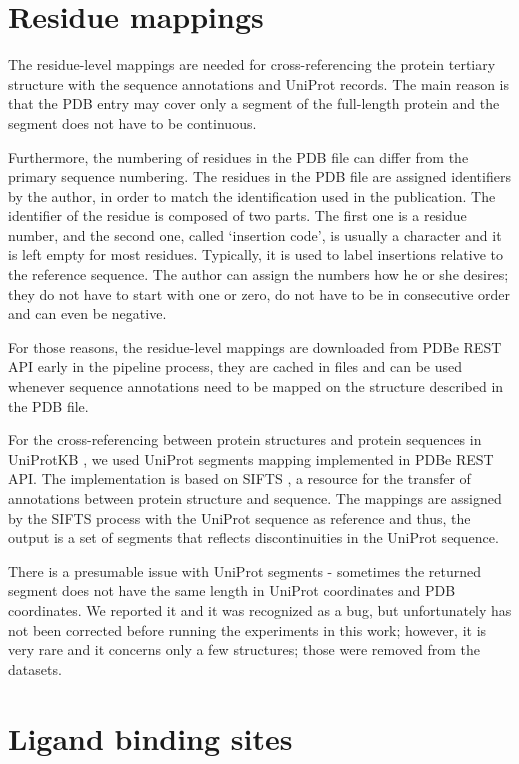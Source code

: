 \section{Residue mappings}

The residue-level mappings are needed for cross-referencing the protein tertiary structure with the sequence annotations and UniProt records. The main reason is that the PDB entry may cover only a segment of the full-length protein and the segment does not have to be continuous.

Furthermore, the numbering of residues in the PDB file can differ from the primary sequence numbering. The residues in the PDB file are assigned identifiers by the author, in order to match the identification used in the publication. The identifier of the residue is composed of two parts. The first one is a residue number, and the second one, called `insertion code', is usually a character and it is left empty for most residues. Typically, it is used to label insertions relative to the reference sequence. The author can assign the numbers how he or she desires; they do not have to start with one or zero, do not have to be in consecutive order and can even be negative.

For those reasons, the residue-level mappings are downloaded from PDBe REST API \cite{pdbe_restapi} early in the pipeline process, they are cached in files and can be used whenever sequence annotations need to be mapped on the structure described in the PDB file.

For the cross-referencing between protein structures and protein sequences in UniProtKB \cite{uniprot}, we used UniProt segments mapping implemented in PDBe REST API. The implementation is based on SIFTS \cite{sifts}, a resource for the transfer of annotations between protein structure and sequence. The mappings are assigned by the SIFTS process with the UniProt sequence as reference and thus, the output is a set of segments that reflects discontinuities in the UniProt sequence.

There is a presumable issue with UniProt segments - sometimes the returned segment does not have the same length in UniProt coordinates and PDB coordinates. We reported it and it was recognized as a bug, but unfortunately has not been corrected before running the experiments in this work; however, it is very rare and it concerns only a few structures; those were removed from the datasets. 

\section{Ligand binding sites}


